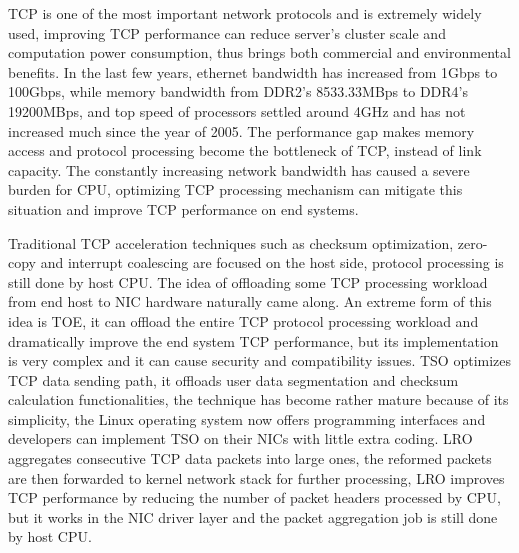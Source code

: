 \documentclass[conference]{IEEEtran}
\begin{document}
TCP is one of the most important network protocols and is extremely widely used, improving TCP performance can reduce server's cluster scale and computation power consumption, thus brings both commercial and environmental benefits. In the last few years, ethernet bandwidth has increased from 1Gbps to 100Gbps, while memory bandwidth from DDR2's 8533.33MBps\cite{wikiddr2} to DDR4's 19200MBps\cite{wikiddr4}, and top speed of processors settled around 4GHz and has not increased much since the year of 2005\cite{danowitz2012cpu}. The performance gap makes memory access and protocol processing become the bottleneck of TCP, instead of link capacity. The constantly increasing network bandwidth has caused a severe burden for CPU, optimizing TCP processing mechanism can mitigate this situation and improve TCP performance on end systems.

Traditional TCP acceleration techniques such as checksum optimization\cite{braden1989computing}\cite{mallory1990incremental}\cite{rijsinghani1994computation}\cite{kleinpaste1995software}, zero-copy\cite{chu1996zero} and interrupt coalescing\cite{dong2011optimizing} are focused on the host side, protocol processing is still done by host CPU. The idea of offloading some TCP processing workload from end host to NIC hardware naturally came along. An extreme form of this idea is TOE\cite{yeh2002introduction}, it can offload the entire TCP protocol processing workload and dramatically improve the end system TCP performance, but its implementation is very complex and it can cause security and compatibility issues\cite{mogul2003tcp}. TSO\cite{connery1999offload} optimizes TCP data sending path, it offloads user data segmentation and checksum calculation functionalities, the technique has become rather mature because of its simplicity, the Linux operating system now offers programming interfaces and developers can implement TSO on their NICs with little extra coding. LRO\cite{grossman2005large} aggregates consecutive TCP data packets into large ones, the reformed packets are then forwarded to kernel network stack for further processing, LRO improves TCP performance by reducing the number of packet headers processed by CPU, but it works in the NIC driver layer and the packet aggregation job is still done by host CPU.
\end{document}
